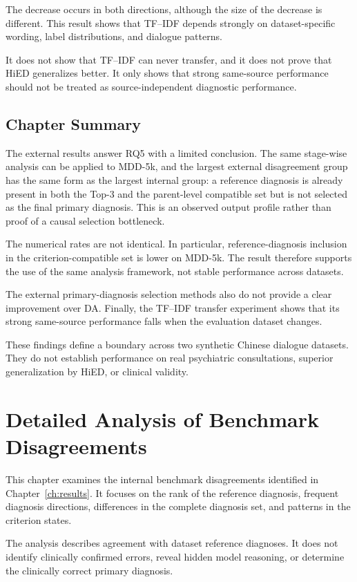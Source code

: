\documentclass[12pt,a4paper,oneside]{report}
\begin{document}
The decrease occurs in both directions, although the size of the
decrease is different. This result shows that TF--IDF depends strongly
on dataset-specific wording, label distributions, and dialogue patterns.

It does not show that TF--IDF can never transfer, and it does not prove
that HiED generalizes better. It only shows that strong same-source
performance should not be treated as source-independent diagnostic
performance.

\section{Chapter Summary}

The external results answer RQ5 with a limited conclusion. The same
stage-wise analysis can be applied to MDD-5k, and the largest external
disagreement group has the same form as the largest internal group: a
reference diagnosis is already present in both the Top-3 and the
parent-level compatible set but is not selected as the final primary
diagnosis. This is an observed output profile rather than proof of a
causal selection bottleneck.

The numerical rates are not identical. In particular, reference-diagnosis
inclusion in the criterion-compatible set is lower on MDD-5k. The result
therefore supports the use of the same analysis framework, not stable
performance across datasets.

The external primary-diagnosis selection methods also do not provide a
clear improvement over DA. Finally, the TF--IDF transfer experiment shows
that its strong same-source performance falls when the evaluation dataset
changes.

These findings define a boundary across two synthetic Chinese dialogue
datasets. They do not establish performance on real psychiatric
consultations, superior generalization by HiED, or clinical validity.

\chapter{Detailed Analysis of Benchmark Disagreements}
\label{ch:error}

This chapter examines the internal benchmark disagreements identified
in Chapter~\ref{ch:results}. It focuses on the rank of the reference
diagnosis, frequent diagnosis directions, differences in the complete
diagnosis set, and patterns in the criterion states.

The analysis describes agreement with dataset reference diagnoses. It
does not identify clinically confirmed errors, reveal hidden model
reasoning, or determine the clinically correct primary diagnosis.
\end{document}
